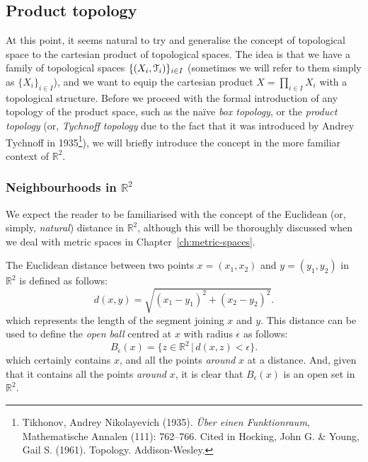 \subsection{Product topology}\label{subsec:product-topology}

At this point, it seems natural to try and generalise the concept of topological space to
the cartesian product of topological spaces. The idea is that we have a family of
topological spaces $\{(X_i, \EuScript{T}_i)\}_{i\in I}$ (sometimes we will refer to them simply
as $\{X_i\}_{i\in I}$), and we want to equip the cartesian product
$X=\prod_{i\in I} X_i$ with a topological structure.
Before we proceed with the formal introduction of any topology of the product space,
such as the na\"{i}ve \emph{box topology}, or
the \emph{product topology} (or,
\emph{Tychnoff topology} due to the fact that it was introduced by Andrey Tychnoff in 1935\footnote{%
	Tikhonov, Andrey Nikolayevich (1935). \emph{\"{U}ber einen Funktionraum}, Mathematische Annalen (111): 762--766.
	Cited in Hocking, John G. \& Young, Gail S. (1961). Topology. Addison-Wesley.%
}), we will briefly introduce the concept in the more familiar context of $\mathbb{R}^2$.

\subsubsection{Neighbourhoods in $\mathbb{R}^2$}\label{subsubsec:neighbourhoods-in-r2}
We expect the reader to be familiarised with the concept of the Euclidean (or, simply, \emph{natural}) distance
in $\mathbb{R}^2$, although this will be thoroughly discussed when we deal with metric spaces in Chapter~\ref{ch:metric-spaces}.

The Euclidean distance between two points $x=(x_1,x_2)$ and $y=(y_1,y_2)$ in $\mathbb{R}^2$ is defined as follows:
\begin{equation}
	d(x,y) = \sqrt{(x_1-y_1)^2+(x_2-y_2)^2}.\label{eq:euclidean-distance}
\end{equation}
which represents the length of the segment joining $x$ and $y$.
This distance can be used to define the \emph{open ball} centred at $x$ with radius $\epsilon$ as follows:
\begin{equation}
	B_\epsilon(x) = \{z\in\mathbb{R}^2\,|\,d(x,z)<\epsilon\}.
	\label{eq:open-ball}
\end{equation}
which certainly contains $x$, and all the points \emph{around} $x$ at a distance.
And, given that it contains all the points \emph{around} $x$, it is clear that $B_\epsilon(x)$ is an open set
in $\mathbb{R}^2$.

